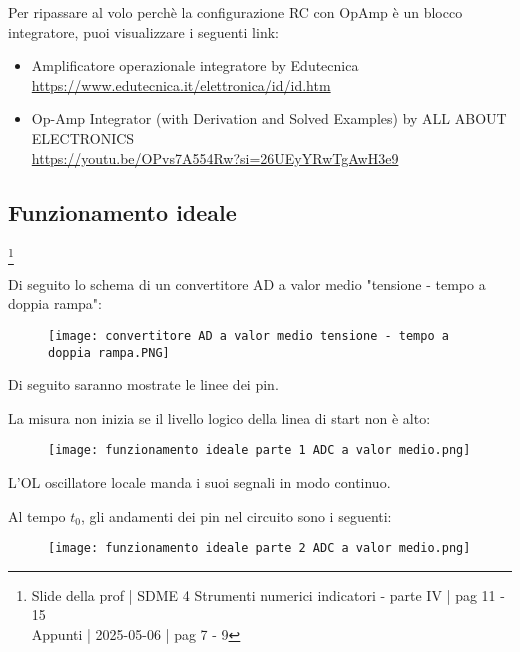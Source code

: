 \begin{tcolorbox}
    Per ripassare al volo perchè la configurazione RC con OpAmp è un blocco integratore, puoi visualizzare i seguenti link: 
    \begin{itemize}
        \item Amplificatore operazionale integratore by Edutecnica \\ \url{https://www.edutecnica.it/elettronica/id/id.htm} 
        \item Op-Amp Integrator (with Derivation and Solved Examples) by ALL ABOUT ELECTRONICS \\ \url{https://youtu.be/OPvs7A554Rw?si=26UEyYRwTgAwH3e9}
    \end{itemize}
\end{tcolorbox}

\newpage 

\subsection{Funzionamento ideale}
\footnote{Slide della prof | SDME 4 Strumenti numerici indicatori - parte IV | pag 11 - 15\\  
Appunti | 2025-05-06 | pag 7 - 9}

Di seguito lo schema di un convertitore AD a valor medio "tensione - tempo a doppia rampa": 

\begin{figure}[h]
    \centering
    \texttt{[image: convertitore AD a valor medio tensione - tempo a doppia rampa.PNG]}
\end{figure}

Di seguito saranno mostrate le linee dei pin. \newline 

La misura non inizia se il livello logico della linea di start non è alto: 

\begin{figure}[h]
    \centering
    \texttt{[image: funzionamento ideale parte 1 ADC a valor medio.png]}
\end{figure}

L'OL oscillatore locale manda i suoi segnali in modo continuo. \newline 

\newpage 

Al tempo $t_0$, gli andamenti dei pin nel circuito sono i seguenti: 

\begin{figure}[h]
    \centering
    \texttt{[image: funzionamento ideale parte 2 ADC a valor medio.png]}
\end{figure}

